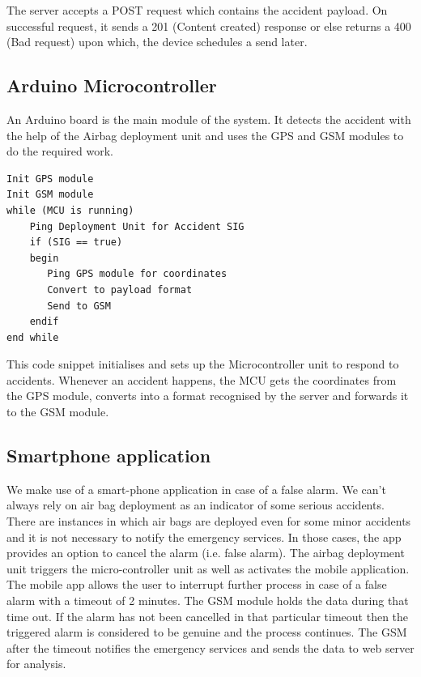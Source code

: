 \documentclass{llncs}
\begin{document}
The server accepts a POST request which contains the accident payload. On successful request, it sends a 201 (Content created) response or else returns a 400 (Bad request) upon which, the device schedules a send later. 

\subsection{Arduino Microcontroller}

An Arduino board is the main module of the system. It detects the accident with the help of the Airbag deployment unit and uses the GPS and GSM modules to do the required work.

\begin{verbatim}
Init GPS module
Init GSM module
while (MCU is running)
    Ping Deployment Unit for Accident SIG
    if (SIG == true)
    begin
       Ping GPS module for coordinates
       Convert to payload format
       Send to GSM
    endif
end while
\end{verbatim}

This code snippet initialises and sets up the Microcontroller unit to respond to accidents. Whenever an accident happens, the MCU gets the coordinates from the GPS module, converts into a format recognised by the server and forwards it to the GSM module.

\subsection{Smartphone application}

We make use of a smart-phone application in case of a false alarm. We can't always rely on air bag deployment as an indicator of some serious accidents. There are instances in which air bags are deployed even for some minor accidents and it is not necessary to notify the emergency services. In those cases, the app provides an option to cancel the alarm (i.e. false alarm). The airbag deployment unit triggers the micro-controller unit as well as activates the mobile application. The mobile app allows the user to interrupt further process in case of a false alarm with a timeout of 2 minutes. The GSM module holds the data during that time out. If the alarm has not been cancelled in that particular timeout then the triggered alarm is considered to be genuine and the process continues. The GSM after the timeout notifies the emergency services and sends the data to web server for analysis.

\newpage
\end{document}
